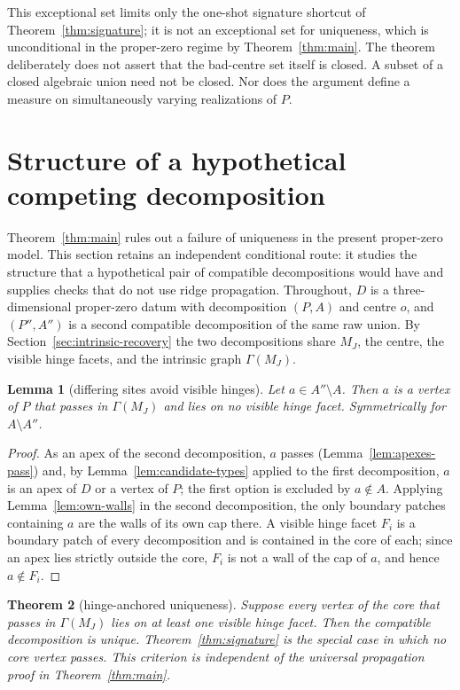 \documentclass[11pt]{amsart}
\newtheorem{theorem}{Theorem}[section]
\newtheorem{lemma}[theorem]{Lemma}
\theoremstyle{definition}
\newcommand{\GammaM}{\Gamma(M_J)}
\begin{document}
This exceptional set limits only the one-shot signature shortcut of
Theorem~\ref{thm:signature}; it is not an exceptional set for uniqueness,
which is unconditional in the proper-zero regime by Theorem~\ref{thm:main}.
The theorem deliberately does not assert that the bad-centre set itself is
closed.  A subset of a closed algebraic union need not be closed.  Nor does the
argument define a measure on simultaneously varying realizations of $P$.

\section{Structure of a hypothetical competing decomposition}
\label{sec:exchange}

Theorem~\ref{thm:main} rules out a failure of uniqueness in the present
proper-zero model.  This section retains an independent conditional route:
it studies the structure that a hypothetical pair of compatible
decompositions would have and supplies checks that do not use ridge
propagation.
Throughout, $D$ is a three-dimensional proper-zero datum with decomposition
$(P,A)$ and centre $o$, and $(P'',A'')$ is a second compatible decomposition
of the same raw union.  By Section~\ref{sec:intrinsic-recovery} the two
decompositions share $M_J$, the centre, the visible hinge facets, and the
intrinsic graph $\GammaM$.

\begin{lemma}[differing sites avoid visible hinges]
\label{lem:diff-site}
Let $a\in A''\setminus A$.  Then $a$ is a vertex of $P$ that passes in
$\GammaM$ and lies on no visible hinge facet.  Symmetrically for
$A\setminus A''$.
\end{lemma}

\begin{proof}
As an apex of the second decomposition, $a$ passes
(Lemma~\ref{lem:apexes-pass}) and, by Lemma~\ref{lem:candidate-types} applied
to the first decomposition, $a$ is an apex of $D$ or a vertex of $P$; the
first option is excluded by $a\notin A$.  Applying
Lemma~\ref{lem:own-walls} in the second decomposition, the only boundary
patches containing $a$ are the walls of its own cap there.  A visible hinge
facet $F_i$ is a boundary patch of every decomposition and is contained in the
core of each; since an apex lies strictly outside the core, $F_i$ is not a
wall of the cap of $a$, and hence $a\notin F_i$.
\end{proof}

\begin{theorem}[hinge-anchored uniqueness]
\label{thm:hinge-anchored}
Suppose every vertex of the core that passes in $\GammaM$ lies on at least one
visible hinge facet.  Then the compatible decomposition is unique.
Theorem~\ref{thm:signature} is the special case in which no core vertex
passes.  This criterion is independent of the universal propagation proof in
Theorem~\ref{thm:main}.
\end{theorem}
\end{document}

